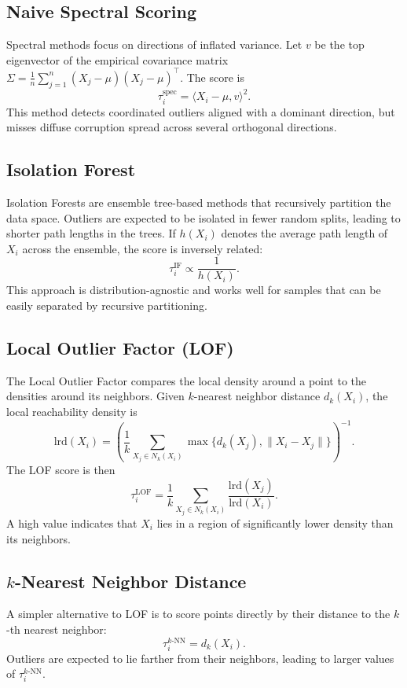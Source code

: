 \documentclass[11pt]{article}
\begin{document}
\subsection{Naive Spectral Scoring}
Spectral methods focus on directions of inflated variance. Let $v$ be the top eigenvector of the empirical
covariance matrix $\Sigma = \tfrac{1}{n}\sum_{j=1}^n (X_j - \mu)(X_j - \mu)^\top$. The score is
\[
\tau_i^{\text{spec}} = \langle X_i - \mu, v \rangle^2.
\]
This method detects coordinated outliers aligned with a dominant direction, but misses diffuse corruption
spread across several orthogonal directions.

\subsection{Isolation Forest}
Isolation Forests are ensemble tree-based methods that recursively partition the data space. Outliers are
expected to be isolated in fewer random splits, leading to shorter path lengths in the trees. If
$h(X_i)$ denotes the average path length of $X_i$ across the ensemble, the score is inversely related:
\[
\tau_i^{\text{IF}} \propto \frac{1}{h(X_i)}.
\]
This approach is distribution-agnostic and works well for samples that can be easily separated by recursive
partitioning.

\subsection{Local Outlier Factor (LOF)}
The Local Outlier Factor compares the local density around a point to the densities around its neighbors.
Given $k$-nearest neighbor distance $d_k(X_i)$, the local reachability density is
\[
\text{lrd}(X_i) = \left( \frac{1}{k} \sum_{X_j \in N_k(X_i)} \max\{d_k(X_j), \|X_i - X_j\|\} \right)^{-1}.
\]
The LOF score is then
\[
\tau_i^{\text{LOF}} = \frac{1}{k}\sum_{X_j \in N_k(X_i)} \frac{\text{lrd}(X_j)}{\text{lrd}(X_i)}.
\]
A high value indicates that $X_i$ lies in a region of significantly lower density than its neighbors.

\subsection{$k$-Nearest Neighbor Distance}
A simpler alternative to LOF is to score points directly by their distance to the $k$-th nearest neighbor:
\[
\tau_i^{k\text{-NN}} = d_k(X_i).
\]
Outliers are expected to lie farther from their neighbors, leading to larger values of $\tau_i^{k\text{-NN}}$.
\end{document}

